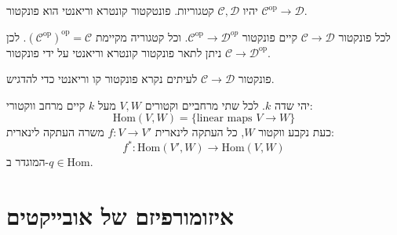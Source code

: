 \documentclass{tstextbook}
\begin{document}
\begin{definition}
יהיו \(\mathcal{C},\mathcal{D}\) קטגוריות. פונטקטור קונטרא וריאנטי הוא פונקטור \(\mathcal{C}^{\text{op}}\to \mathcal{D}\).

\end{definition}
\begin{remark}
לכל פונקטור \(\mathcal{C}\to \mathcal{D}\) קיים פונקטור \(\mathcal{C}^{\text{op}}\to \mathcal{D}^{op}\). וכל קטגוריה מקיימת \((\mathcal{C}^{\text{op}})^{\text{op}}=\mathcal{C}\). לכן ניתן לתאר פונקטור קונטרא וריאנטי על ידי פונקטור \(\mathcal{C}\to \mathcal{D}^{\text{op}}\).

\end{remark}
\begin{remark}
פונקטור \(\mathcal{C}\to \mathcal{D}\) לעיתים נקרא פונקטור קו וריאנטי כדי להדגיש.

\end{remark}
\begin{example}
יהי שדה \(k\). לכל שתי מרחביים וקטורים \(V,W\) מעל \(k\) קיים מרחב ווקטורי:
$$\mathrm{Hom}(V,W)=\{ \text{linear maps }V \to W\}$$
כעת נקבע ווקטור \(W\), כל העתקה לינארית \(f:V\to V'\) משרה העתקה לינארית:
$$f^{*}:\mathrm{Hom}(V',W)\to \mathrm{Hom}(V,W)$$
המוגדר ב-\(q \in \mathrm{Hom}\).

\end{example}
\section{איזומורפיזם של אובייקטים}
\end{document}
